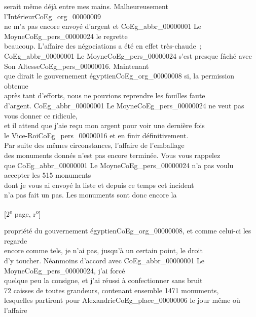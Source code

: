 \documentclass{book}
\begin{document}
serait même déjà entre mes mains. Malheureusement l’Intérieur\gls{CoEg_org_00000009}\\
ne m’a pas encore envoyé d’argent et \gls{CoEg_abbr_00000001} Le Moyne\gls{CoEg_pers_00000024} le regrette\\
beaucoup. L’affaire des négociations a été en effet très-chaude~;\\
\gls{CoEg_abbr_00000001} Le Moyne\gls{CoEg_pers_00000024} s’est presque fâché avec Son Altesse\gls{CoEg_pers_00000016}. Maintenant\\
que dirait le gouvernement égyptien\gls{CoEg_org_00000008} si, la permission obtenue\\
après tant d’efforts, nous ne pouvions reprendre les fouilles faute\\
d’argent. \gls{CoEg_abbr_00000001} Le Moyne\gls{CoEg_pers_00000024} ne veut pas vous donner ce ridicule,\\
et il attend que j’aie reçu mon argent pour voir une dernière fois\\
le Vice-Roi\gls{CoEg_pers_00000016} et en finir définitivement.\\
\indent Par suite des mêmes circonstances, l’affaire de l’emballage\\
des monuments donnés n’est pas encore terminée. Vous vous rappelez\\
que \gls{CoEg_abbr_00000001} Le Moyne\gls{CoEg_pers_00000024} n’a pas voulu accepter les 515 monuments\\
dont je vous ai envoyé la liste et depuis ce temps cet incident\\
n’a pas fait un pas. Les monuments sont donc encore la
{\footnotesize \begin{center} [2\textsuperscript{e} page, r\textsuperscript{o}]\end{center}}
\noindent propriété du gouvernement égyptien\gls{CoEg_org_00000008}, et comme celui-ci les regarde\\
encore comme tels, je n’ai pas, jusqu’à un certain point, le droit\\
d’y toucher. Néanmoins d’accord avec \gls{CoEg_abbr_00000001} Le Moyne\gls{CoEg_pers_00000024}, j’ai forcé\\
quelque peu la consigne, et j’ai réussi à confectionner sans bruit\\
72 caisses de toutes grandeurs, contenant ensemble 1471 monuments,\\
lesquelles partiront pour Alexandrie\gls{CoEg_place_00000006} le jour même où l’affaire\\
\end{document}
